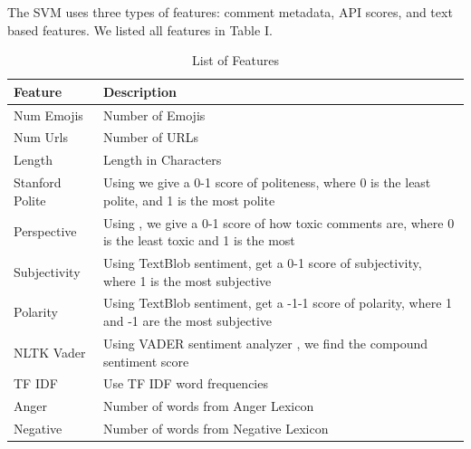 \documentclass[conference]{IEEEtran}
\begin{document}
The SVM uses three types of features: comment metadata, API scores, and text based features. We listed all features in Table I. 

\begin{table}[]
	\begin{tabular}{ p{2cm} p{6cm}} \hline
		\textbf{Feature} & \textbf{Description}                                                                                        \\ \hline
		Num Emojis       & Number of Emojis                                                                                             \\
		Num Urls         & Number of URLs                                                                                              \\ 
		Length           & Length in Characters                                                                                        \\
		Stanford Polite  & Using \cite{danescu2013computational} we give a 0-1 score of politeness, where 0 is the least polite, and 1 is the most polite     \\ 
		Perspective      & Using \cite{perspective}, we give a 0-1 score of how toxic comments are, where 0 is the least toxic and 1 is the most \\
		Subjectivity     & Using TextBlob sentiment, get a 0-1 score of subjectivity, where 1 is the most subjective                   \\ 
		Polarity         & Using TextBlob sentiment, get a -1-1 score of polarity, where 1 and -1 are the most subjective              \\
		NLTK Vader       & Using VADER sentiment analyzer \cite{hutto2014vader}, we find the compound sentiment score                             \\
		TF IDF           & Use TF IDF word frequencies                                                                                 \\ 
		Anger            & Number of words from Anger Lexicon \cite{zhang2018conversations}                                                               \\ 
		Negative         & Number of words from Negative Lexicon \cite{zhang2018conversations} \\  \hline                                                           
	\end{tabular}
\\ 
\caption{List of Features} 
\end{table}
\end{document}
